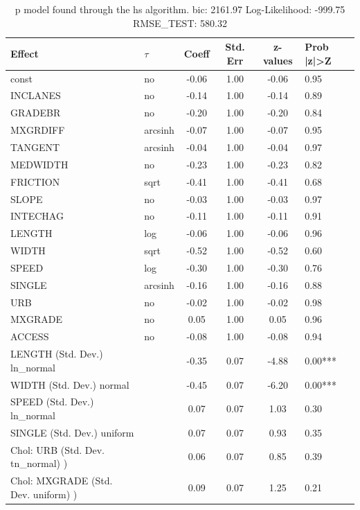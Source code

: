 \begin{table}
	\caption{p model found through the hs algorithm. bic: 2161.97 Log-Likelihood: -999.75 RMSE_TEST: 580.32}
	\begin{center}
		\begin{tabular}{|l|l|c|c|c|l|}
			\hline
			Effect & $\tau$ & Coeff & Std. Err & z-values & Prob |z|>Z \\
			\hline
			const & no & -0.06 & 1.00 & -0.06 & 0.95 \\
			\hline
			INCLANES & no & -0.14 & 1.00 & -0.14 & 0.89 \\
			\hline
			GRADEBR & no & -0.20 & 1.00 & -0.20 & 0.84 \\
			\hline
			MXGRDIFF & arcsinh & -0.07 & 1.00 & -0.07 & 0.95 \\
			\hline
			TANGENT & arcsinh & -0.04 & 1.00 & -0.04 & 0.97 \\
			\hline
			MEDWIDTH & no & -0.23 & 1.00 & -0.23 & 0.82 \\
			\hline
			FRICTION & sqrt & -0.41 & 1.00 & -0.41 & 0.68 \\
			\hline
			SLOPE & no & -0.03 & 1.00 & -0.03 & 0.97 \\
			\hline
			INTECHAG & no & -0.11 & 1.00 & -0.11 & 0.91 \\
			\hline
			LENGTH & log & -0.06 & 1.00 & -0.06 & 0.96 \\
			\hline
			WIDTH & sqrt & -0.52 & 1.00 & -0.52 & 0.60 \\
			\hline
			SPEED & log & -0.30 & 1.00 & -0.30 & 0.76 \\
			\hline
			SINGLE & arcsinh & -0.16 & 1.00 & -0.16 & 0.88 \\
			\hline
			URB & no & -0.02 & 1.00 & -0.02 & 0.98 \\
			\hline
			MXGRADE & no & 0.05 & 1.00 & 0.05 & 0.96 \\
			\hline
			ACCESS & no & -0.08 & 1.00 & -0.08 & 0.94 \\
			\hline
			LENGTH (Std. Dev.) ln_normal &  & -0.35 & 0.07 & -4.88 & 0.00*** \\
			\hline
			WIDTH (Std. Dev.) normal &  & -0.45 & 0.07 & -6.20 & 0.00*** \\
			\hline
			SPEED (Std. Dev.) ln_normal &  & 0.07 & 0.07 & 1.03 & 0.30 \\
			\hline
			SINGLE (Std. Dev.) uniform &  & 0.07 & 0.07 & 0.93 & 0.35 \\
			\hline
			 Chol: URB (Std. Dev. tn_normal) ) &  & 0.06 & 0.07 & 0.85 & 0.39 \\
			\hline
			 Chol: MXGRADE (Std. Dev. uniform) ) &  & 0.09 & 0.07 & 1.25 & 0.21 \\

\end{tabular}
\end{center}
\end{table}
